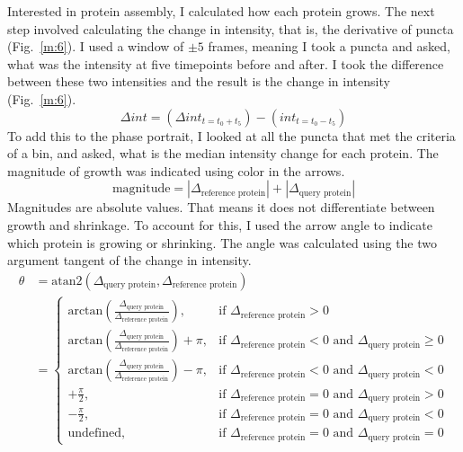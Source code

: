Interested in protein assembly, I calculated how each protein grows. The next step involved calculating the change in intensity, that is, the derivative of puncta (Fig.~\ref{m:6}). I used a window of $\pm5$ frames, meaning I took a puncta and asked, what was the intensity at five timepoints before and after. I took the difference between these two intensities and the result is the change in intensity (Fig.~\ref{m:6}).
\begin{equation*}
\Delta int = (\Delta {int}_{t =t_0+t_5}) - ({int}_{t =t_0-t_5})
\end{equation*}
To add this to the phase portrait, I looked at all the puncta that met the criteria of a bin, and asked, what is the median intensity change for each protein. The magnitude of growth was indicated using color in the arrows.
\begin{equation*}
\text{magnitude} = |\Delta_\text{reference protein}| + |\Delta_\text{query protein}|
\end{equation*}
Magnitudes are absolute values. That means it does not differentiate between growth and shrinkage. To account for this, I used the arrow angle to indicate which protein is growing or shrinking. The angle was calculated using the two argument tangent of the change in intensity.
\begin{equation*}
\begin{aligned}
\theta &= \text{atan2}(\Delta_\text{query protein}, \Delta_\text{reference protein})\\&=
\left\{\begin{array}{ll}

\text{arctan}(\frac{\Delta_\text{query protein}}{\Delta_\text{reference protein}}), & \text{if }\Delta_\text{reference protein} > 0\\

\text{arctan}(\frac{\Delta_\text{query protein}}{\Delta_\text{reference protein}})+\pi, & \text{if }\Delta_\text{reference protein} < 0 \text{ and }\Delta_\text{query protein} \ge 0\\

\text{arctan}(\frac{\Delta_\text{query protein}}{\Delta_\text{reference protein}})-\pi, & \text{if }\Delta_\text{reference protein} < 0 \text{ and }\Delta_\text{query protein} < 0\\

+\frac{\pi}{2}, & \text{if }\Delta_\text{reference protein} =0 \text{ and }\Delta_\text{query protein}>0\\

-\frac{\pi}{2}, & \text{if }\Delta_\text{reference protein} =0 \text{ and }\Delta_\text{query protein}<0\\

\text{undefined}, & \text{if }\Delta_\text{reference protein} =0 \text{ and }\Delta_\text{query protein}=0

\end{array}\right.
\end{aligned}
\end{equation*}


